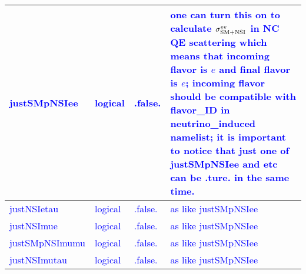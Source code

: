 \documentclass{article}
\begin{document}
\begin{longtable}{llll}
\textcolor{blue}{justSMpNSIee} & \begin{minipage}[t]{2cm}\textcolor{blue}{logical}\end{minipage} & \begin{minipage}[t]{2cm}\textcolor{blue}{.false.}\end{minipage} & \begin{minipage}[t]{12cm}\textcolor{blue}{one can turn this on to calculate $\sigma_{\rm SM+NSI}^{e e}$ in NC QE scattering which means that incoming flavor is $e$ and final flavor is $e$; incoming flavor should be compatible with flavor\_ID in neutrino\_induced namelist; it is important to notice that just one of justSMpNSIee and etc can be .ture. in the same time.}\end{minipage}\\*
\midrule
\textcolor{blue}{justNSIetau} & \begin{minipage}[t]{2cm}\textcolor{blue}{logical}\end{minipage} & \begin{minipage}[t]{2cm}\textcolor{blue}{.false.}\end{minipage} & \begin{minipage}[t]{12cm}\textcolor{blue}{as like justSMpNSIee}\end{minipage}\\*
\midrule
\textcolor{blue}{justNSImue} & \begin{minipage}[t]{2cm}\textcolor{blue}{logical}\end{minipage} & \begin{minipage}[t]{2cm}\textcolor{blue}{.false.}\end{minipage} & \begin{minipage}[t]{12cm}\textcolor{blue}{as like justSMpNSIee}\end{minipage}\\*
\midrule
\textcolor{blue}{justSMpNSImumu} & \begin{minipage}[t]{2cm}\textcolor{blue}{logical}\end{minipage} & \begin{minipage}[t]{2cm}\textcolor{blue}{.false.}\end{minipage} & \begin{minipage}[t]{12cm}\textcolor{blue}{as like justSMpNSIee}\end{minipage}\\*
\midrule
\textcolor{blue}{justNSImutau} & \begin{minipage}[t]{2cm}\textcolor{blue}{logical}\end{minipage} & \begin{minipage}[t]{2cm}\textcolor{blue}{.false.}\end{minipage} & \begin{minipage}[t]{12cm}\textcolor{blue}{as like justSMpNSIee}\end{minipage}\\*

\end{longtable}
\end{document}
